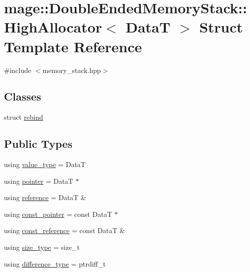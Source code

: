 \hypertarget{structmage_1_1_double_ended_memory_stack_1_1_high_allocator}{}\section{mage\+:\+:Double\+Ended\+Memory\+Stack\+:\+:High\+Allocator$<$ DataT $>$ Struct Template Reference}
\label{structmage_1_1_double_ended_memory_stack_1_1_high_allocator}


{\ttfamily \#include $<$memory\+\_\+stack.\+hpp$>$}

\subsection*{Classes}
\begin{DoxyCompactItemize}
\item 
struct \hyperlink{structmage_1_1_double_ended_memory_stack_1_1_high_allocator_1_1rebind}{rebind}
\end{DoxyCompactItemize}
\subsection*{Public Types}
\begin{DoxyCompactItemize}
\item 
using \hyperlink{structmage_1_1_double_ended_memory_stack_1_1_high_allocator_a43b87cea37b3bbba57ca794e9785e82d}{value\+\_\+type} = DataT
\item 
using \hyperlink{structmage_1_1_double_ended_memory_stack_1_1_high_allocator_a97e4dbd7053c951de9e444d95a70809d}{pointer} = DataT $\ast$
\item 
using \hyperlink{structmage_1_1_double_ended_memory_stack_1_1_high_allocator_ad037b00a52ebac3f03afd81bc16db9df}{reference} = DataT \&
\item 
using \hyperlink{structmage_1_1_double_ended_memory_stack_1_1_high_allocator_ab0d52e1c59565e79f3bd5f0f02e65966}{const\+\_\+pointer} = const DataT $\ast$
\item 
using \hyperlink{structmage_1_1_double_ended_memory_stack_1_1_high_allocator_a7f30fe90c403660a55f0ac05891f7ec1}{const\+\_\+reference} = const DataT \&
\item 
using \hyperlink{structmage_1_1_double_ended_memory_stack_1_1_high_allocator_a0d2e29171c7898850631b1a57a29fe0d}{size\+\_\+type} = size\+\_\+t
\item 
using \hyperlink{structmage_1_1_double_ended_memory_stack_1_1_high_allocator_a7b3fd8c4d6000165eac95eca43b28a66}{difference\+\_\+type} = ptrdiff\+\_\+t
\end{DoxyCompactItemize}
